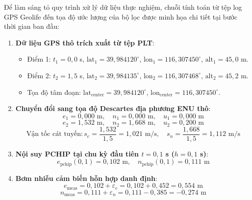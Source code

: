 \hspace{0.5cm} Để làm sáng tỏ quy trình xử lý dữ liệu thực nghiệm, chuỗi tính toán từ tệp log GPS Geolife đến tọa độ ước lượng của bộ lọc được minh họa chi tiết tại bước thời gian ban đầu:

\begin{enumerate}
    \item \textbf{Dữ liệu GPS thô trích xuất từ tệp PLT}:
    \begin{itemize}
        \item Điểm 1: $t_1 = 0{,}0$ s, $\text{lat}_1 = 39{,}984120^\circ$, $\text{lon}_1 = 116{,}307450^\circ$, $\text{alt}_1 = 45{,}0$ m.
        \item Điểm 2: $t_2 = 1{,}5$ s, $\text{lat}_2 = 39{,}984135^\circ$, $\text{lon}_2 = 116{,}307468^\circ$, $\text{alt}_2 = 45{,}2$ m.
        \item Tọa độ tâm đoạn: $\text{lat}_{\text{center}} = 39{,}984120^\circ$, $\text{lon}_{\text{center}} = 116{,}307450^\circ$.
    \end{itemize}

    \item \textbf{Chuyển đổi sang tọa độ Descartes địa phương ENU thô}:
    \begin{equation}
    e_1 = 0{,}000 \text{ m}, \quad n_1 = 0{,}000 \text{ m}, \quad u_1 = 0{,}000 \text{ m}
    \end{equation}
    \begin{equation}
    e_2 = 1{,}532 \text{ m}, \quad n_2 = 1{,}668 \text{ m}, \quad u_2 = 0{,}200 \text{ m}
    \end{equation}
    \begin{equation}
    \text{Vận tốc cát tuyến}: s_e = \frac{1{,}532}{1{,}5} = 1{,}021 \text{ m/s}, \quad s_n = \frac{1{,}668}{1{,}5} = 1{,}112 \text{ m/s}
    \end{equation}

    \item \textbf{Nội suy PCHIP tại chu kỳ đầu tiên $t = 0{,}1$ s ($h = 0{,}1$ s)}:
    \begin{equation}
    e_{\text{pchip}}(0{,}1) = 0{,}102 \text{ m}, \quad n_{\text{pchip}}(0{,}1) = 0{,}111 \text{ m}
    \end{equation}

    \item \textbf{Bơm nhiễu cảm biến hỗn hợp danh định}:
    \begin{equation}
    e_{\text{meas}} = 0{,}102 + \varepsilon_e = 0{,}102 + 0{,}452 = 0{,}554 \text{ m}
    \end{equation}
    \begin{equation}
    n_{\text{meas}} = 0{,}111 + \varepsilon_n = 0{,}111 - 0{,}385 = -0{,}274 \text{ m}
    \end{equation}


\end{enumerate}
